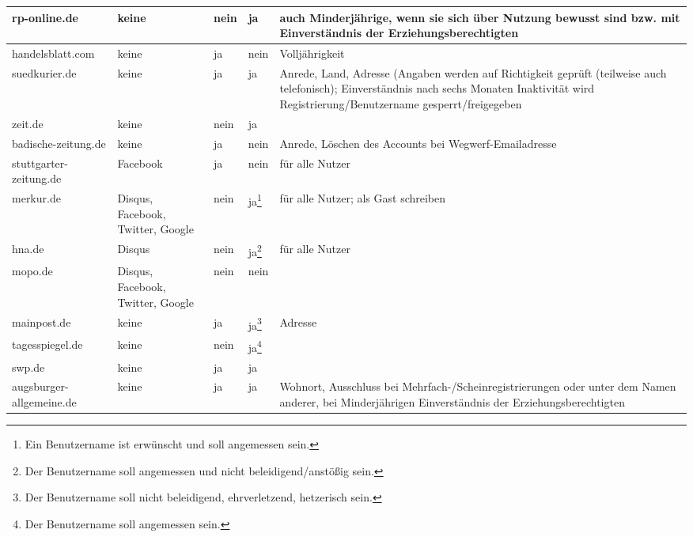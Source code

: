 \begin{longtable}{p{24mm}p{20mm}p{10mm}p{10mm}p{60mm}}
rp-online.de %
& keine
& \centerline{nein}
& \centerline{ja}
& auch Minderjährige, wenn sie sich über Nutzung bewusst sind bzw. mit
  Einverständnis der Erziehungsberechtigten
\\\midrule

handelsblatt.com %
& keine
& \centerline{ja}
& \centerline{nein}
& Volljährigkeit
\\\midrule

suedkurier.de %
& keine
& \centerline{ja}
& \centerline{ja}
& Anrede, Land, Adresse (Angaben werden auf Richtigkeit geprüft (teilweise auch
  telefonisch); Einverständnis nach sechs Monaten Inaktivität wird
  Registrierung/Benutzername gesperrt/freigegeben
\\\midrule

zeit.de %
& keine
& \centerline{nein}
& \centerline{ja}
&
\\\midrule

badische-zeitung.de %
& keine
& \centerline{ja}
& \centerline{nein}
& Anrede, Löschen des Accounts bei Wegwerf-Emailadresse
\\\midrule

stuttgarter-zeitung.de %
& Facebook
& \centerline{ja}
& \centerline{nein}
&für alle Nutzer
\\\midrule

merkur.de %
& Disqus, Facebook, Twitter, Google
& \centerline{nein}
& \centerline{ja\footnote{Ein Benutzername ist erwünscht und soll angemessen
sein.}}
& für alle Nutzer; als Gast schreiben
\\\midrule

hna.de %
& Disqus
& \centerline{nein}
& \centerline{ja\footnote{Der Benutzername soll angemessen und nicht beleidigend/anstößig
  sein.}}
&für alle Nutzer
\\\midrule

mopo.de %
& Disqus, Facebook, Twitter, Google
& \centerline{nein}
& \centerline{nein}
&
\\\midrule

mainpost.de %
& keine
& \centerline{ja}
& \centerline{ja\footnote{Der Benutzername soll nicht beleidigend, ehrverletzend, hetzerisch
  sein.}}
& Adresse
\\\midrule

tagesspiegel.de %
& keine
& \centerline{nein}
& \centerline{ja\footnote{Der Benutzername soll angemessen sein.}}
&
\\\midrule

swp.de %
& keine
& \centerline{ja}
& \centerline{ja}
&
\\\midrule

augsburger-allgemeine.de %
& keine
& \centerline{ja}
& \centerline{ja}
& Wohnort, Ausschluss bei Mehrfach-/Scheinregistrierungen oder unter dem Namen
  anderer, bei Minderjährigen Einverständnis der Erziehungsberechtigten
\end{longtable}
\endgroup

